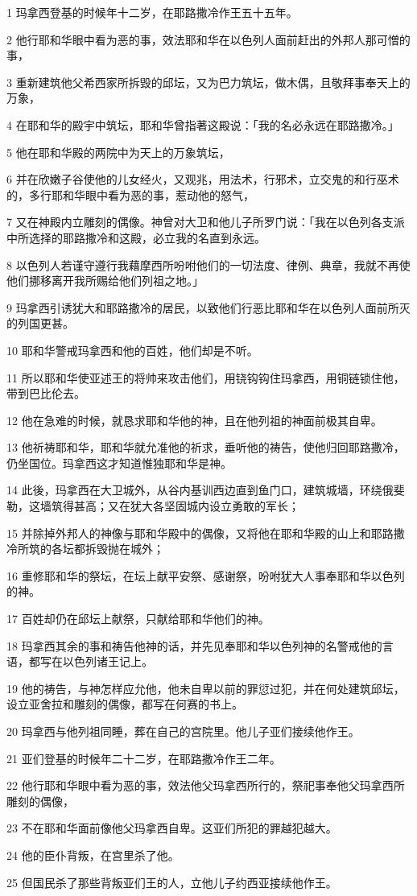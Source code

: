 \par 1 玛拿西登基的时候年十二岁，在耶路撒冷作王五十五年。
\par 2 他行耶和华眼中看为恶的事，效法耶和华在以色列人面前赶出的外邦人那可憎的事，
\par 3 重新建筑他父希西家所拆毁的邱坛，又为巴力筑坛，做木偶，且敬拜事奉天上的万象，
\par 4 在耶和华的殿宇中筑坛，耶和华曾指著这殿说：「我的名必永远在耶路撒冷。」
\par 5 他在耶和华殿的两院中为天上的万象筑坛，
\par 6 并在欣嫩子谷使他的儿女经火，又观兆，用法术，行邪术，立交鬼的和行巫术的，多行耶和华眼中看为恶的事，惹动他的怒气，
\par 7 又在神殿内立雕刻的偶像。神曾对大卫和他儿子所罗门说：「我在以色列各支派中所选择的耶路撒冷和这殿，必立我的名直到永远。
\par 8 以色列人若谨守遵行我藉摩西所吩咐他们的一切法度、律例、典章，我就不再使他们挪移离开我所赐给他们列祖之地。」
\par 9 玛拿西引诱犹大和耶路撒冷的居民，以致他们行恶比耶和华在以色列人面前所灭的列国更甚。
\par 10 耶和华警戒玛拿西和他的百姓，他们却是不听。
\par 11 所以耶和华使亚述王的将帅来攻击他们，用铙钩钩住玛拿西，用铜链锁住他，带到巴比伦去。
\par 12 他在急难的时候，就恳求耶和华他的神，且在他列祖的神面前极其自卑。
\par 13 他祈祷耶和华，耶和华就允准他的祈求，垂听他的祷告，使他归回耶路撒冷，仍坐国位。玛拿西这才知道惟独耶和华是神。
\par 14 此後，玛拿西在大卫城外，从谷内基训西边直到鱼门口，建筑城墙，环绕俄斐勒，这墙筑得甚高；又在犹大各坚固城内设立勇敢的军长；
\par 15 并除掉外邦人的神像与耶和华殿中的偶像，又将他在耶和华殿的山上和耶路撒冷所筑的各坛都拆毁抛在城外；
\par 16 重修耶和华的祭坛，在坛上献平安祭、感谢祭，吩咐犹大人事奉耶和华以色列的神。
\par 17 百姓却仍在邱坛上献祭，只献给耶和华他们的神。
\par 18 玛拿西其余的事和祷告他神的话，并先见奉耶和华以色列神的名警戒他的言语，都写在以色列诸王记上。
\par 19 他的祷告，与神怎样应允他，他未自卑以前的罪愆过犯，并在何处建筑邱坛，设立亚舍拉和雕刻的偶像，都写在何赛的书上。
\par 20 玛拿西与他列祖同睡，葬在自己的宫院里。他儿子亚们接续他作王。
\par 21 亚们登基的时候年二十二岁，在耶路撒冷作王二年。
\par 22 他行耶和华眼中看为恶的事，效法他父玛拿西所行的，祭祀事奉他父玛拿西所雕刻的偶像，
\par 23 不在耶和华面前像他父玛拿西自卑。这亚们所犯的罪越犯越大。
\par 24 他的臣仆背叛，在宫里杀了他。
\par 25 但国民杀了那些背叛亚们王的人，立他儿子约西亚接续他作王。

